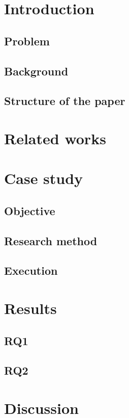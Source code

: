 \documentclass[lnbip]{svmultln}
\begin{document}
\section{Introduction}

\subsection{Problem}
\subsection{Background}
\subsection{Structure of the paper}
%

\section{Related works}

\section{Case study}

\subsection{Objective}
\subsection{Research method}
\subsection{Execution}

\section{Results}

\subsection{RQ1}
\subsection{RQ2}

\section{Discussion}
\end{document}
